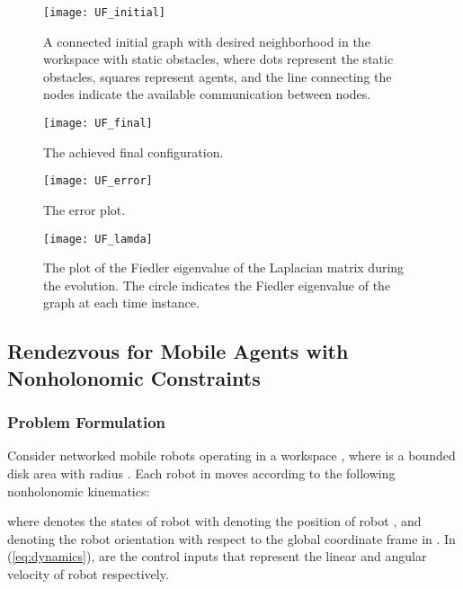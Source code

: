 \documentclass[english]{IOS-Book-Article}
\theoremstyle{definition}
\theoremstyle{definition}
\begin{document}
\begin{figure}
\centering{}\texttt{[image: UF\_initial]}

\caption{A connected initial graph with desired neighborhood in the workspace
with static obstacles, where dots represent the static obstacles,
squares represent agents, and the line connecting the nodes indicate
the available communication between nodes.}


\label{fig:uf_initial}
\end{figure}
\begin{figure}
\centering{}\texttt{[image: UF\_final]}

\caption{The achieved final configuration.}


\label{fig:uf_final}
\end{figure}
\begin{figure}
\centering{}\texttt{[image: UF\_error]}

\caption{The error plot.}


\label{fig:uf_error}
\end{figure}
\begin{figure}
\centering{}\texttt{[image: UF\_lamda]}

\caption{The plot of the Fiedler eigenvalue of the Laplacian matrix during
the evolution. The circle indicates the Fiedler eigenvalue of the
graph at each time instance.}


\label{fig:uf_lamda}
\end{figure}



\subsection{Rendezvous for Mobile Agents with Nonholonomic Constraints}


\subsubsection{Problem Formulation}

Consider  networked mobile robots operating in a workspace ,
where  is a bounded disk area with radius .
Each robot in  moves according to the following nonholonomic
kinematics:

where  denotes the states of robot  with  denoting the position of robot , and 
denoting the robot orientation with respect to the global coordinate
frame in . In (\ref{eq:dynamics}), 
 are the control inputs that
represent the linear and angular velocity of robot  respectively.
\end{document}
